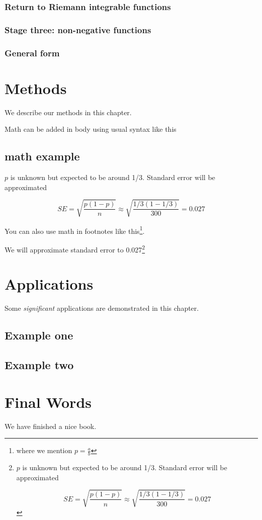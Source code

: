 \documentclass[
]{book}
\theoremstyle{definition}
\theoremstyle{definition}
\theoremstyle{definition}
\theoremstyle{definition}
\theoremstyle{remark}
\begin{document}
\subsection{Return to Riemann integrable functions}\label{return-to-riemann-integrable-functions}

\subsection{Stage three: non-negative functions}\label{stage-three-non-negative-functions}

\subsection{General form}\label{general-form}

\chapter{Methods}\label{methods}

We describe our methods in this chapter.

Math can be added in body using usual syntax like this

\section{math example}\label{math-example}

\(p\) is unknown but expected to be around 1/3. Standard error will be approximated

\[
SE = \sqrt{\frac{p(1-p)}{n}} \approx \sqrt{\frac{1/3 (1 - 1/3)} {300}} = 0.027
\]

You can also use math in footnotes like this\footnote{where we mention \(p = \frac{a}{b}\)}.

We will approximate standard error to 0.027\footnote{\(p\) is unknown but expected to be around 1/3. Standard error will be approximated

  \[
  SE = \sqrt{\frac{p(1-p)}{n}} \approx \sqrt{\frac{1/3 (1 - 1/3)} {300}} = 0.027
  \]}

\chapter{Applications}\label{applications}

Some \emph{significant} applications are demonstrated in this chapter.

\section{Example one}\label{example-one}

\section{Example two}\label{example-two}

\chapter{Final Words}\label{final-words}

We have finished a nice book.

  
\end{document}
